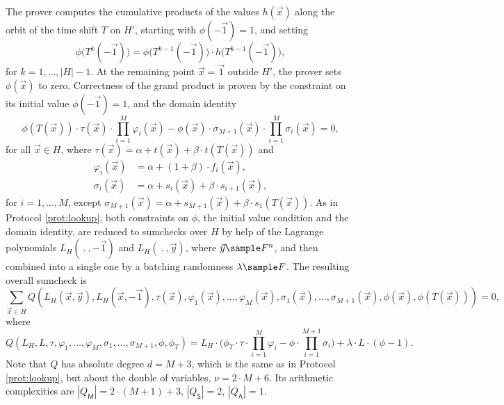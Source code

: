 \documentclass[11pt]{article}
\theoremstyle{definition}
\theoremstyle{remark}
\begin{document}
The prover computes the cumulative products of the values $h(\vec x)$ along the orbit of the time shift $T$ on $H'$, starting with $\phi(-\vec 1) = 1$, and setting
\[
\phi\big(T^{k}(-\vec 1)\big) = \phi\big(T^{k-1}(-\vec 1)\big) \cdot h\big(T^{k-1}(-\vec 1)\big),
\]
for $k=1, \ldots, |H|-1$.
At the remaining point $\vec x = \vec 1$ outside $H'$, the prover sets $\phi(\vec x)$ to zero.
Correctness of the grand product is proven by the constraint on its initial value $\phi(-\vec 1) = 1$, and the domain identity
\begin{equation}
\phi(T( \vec x)) \cdot  \tau(\vec x)\cdot \prod_{i=1}^M  \varphi_{i}(\vec x) 
- \phi(\vec x)\cdot \sigma_{M+1}(\vec x)\cdot \prod_{i=1}^M \sigma_{i}(\vec x)
= 0, 
\end{equation}
for all $\vec x \in H$, where $\tau(\vec x) = \alpha + t(\vec x) + \beta\cdot t(T( \vec x))$ and
\begin{align*}
\varphi_{i} (\vec x) &=\alpha +  (1+\beta)\cdot f_i(\vec x),
\\
\sigma_{i}(\vec x) &= \alpha + s_i(\vec x) + \beta\cdot s_{i+1}(\vec x), 
\end{align*}
 for $i=1,\ldots, M$, except $\sigma_{M+1}(\vec x) =  \alpha + s_{M+1}(\vec x) + \beta\cdot s_1(T( \vec x))$.
As in Protocol \ref{prot:lookup}, both constraints on $\phi$, the initial value condition and the domain identity, are reduced to sumchecks over $H$ by help of the Lagrange polynomials $L_H(\:.\:, -\vec 1)$ and $L_H(\:.\:, \vec y)$, where $\vec y\sample F^n$, and then combined into a single one by a batching randomness $\lambda\sample F$.
The resulting overall sumcheck is
\[
\sum_{\vec x\in H} Q(L_H(\vec x, \vec y), L_H(\vec x, -\vec 1),  \tau(\vec x), \varphi_{1}(\vec x),\ldots, \varphi_{M}(\vec x), \sigma_{1}(\vec x),\ldots, \sigma_{M+1}(\vec x),  \phi(\vec x), \phi(T(\vec x))) = 0,
\]
where
\begin{equation}
\label{e:lookup:hyperplonk:Q}
Q(L_H, L,   \tau, \varphi_1,\ldots, \varphi_M, \sigma_1,\ldots, \sigma_{M+1}, \phi, \phi_T) 
= L_H \cdot \Big(\phi_T \cdot \tau \cdot\prod_{i=1}^M \varphi_i
- \phi \cdot \prod_{i=1}^{M+1} \sigma_i \Big)
+ \lambda\cdot L \cdot (\phi - 1). 
\end{equation}
Note that $Q$ has  absolute degree $d = M+3$, which is the same as in Protocol \ref{prot:lookup}, but  about the double of variables, $\nu= 2\cdot M+ 6$.
Its arithmetic complexities are $|Q_\mathsf M|= 2\cdot(M+1) + 3$, $|Q_\mathsf S|= 2$, $|Q_\mathsf A|= 1$. 
\end{document}
